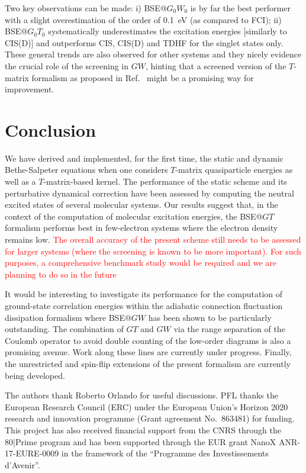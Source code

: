 \documentclass[aip,jcp,reprint,noshowkeys,superscriptaddress]{revtex4-1}
\newcommand{\alert}[1]{\textcolor{red}{#1}}
\begin{document}
Two key observations can be made:
i) BSE@$G_0W_0$ is by far the best performer with a slight overestimation of the order of \SI{0.1}{eV} (as compared to FCI);
ii) BSE@$G_0T_0$ systematically underestimates the excitation energies [similarly to CIS(D)] and outperforms CIS, CIS(D) and TDHF for the singlet states only. 
These general trends are also observed for other systems and they nicely evidence the crucial role of the screening in $GW$, hinting that a screened version of the $T$-matrix formalism as proposed in Ref.~ might be a promising way for improvement.

\section{Conclusion}
\label{sec:ccl}
We have derived and implemented, for the first time, the static and dynamic Bethe-Salpeter equations when one considers $T$-matrix quasiparticle energies as well as a $T$-matrix-based kernel.
The performance of the static scheme and its perturbative dynamical correction have been assessed by computing the neutral excited states of several molecular systems.
Our results suggest that, in the context of the computation of molecular excitation energies, the BSE@$GT$ formalism performs best in few-electron systems where the electron density remains low.
\alert{The overall accuracy of the present scheme still needs to be assessed for larger systems (where the screening is known to be more important). 
For such purposes, a comprehensive benchmark study would be required and we are planning to do so in the future}

It would be interesting to investigate its performance for the computation of ground-state correlation energies within the adiabatic connection fluctuation dissipation formalism where BSE@$GW$ has been shown to be particularly outstanding. \cite{Maggio_2016,Holzer_2018b,Loos_2020e}
The combination of $GT$ and $GW$ via the range separation of the Coulomb operator to avoid double counting of the low-order diagrams is also a promising avenue.
Work along these lines are currently under progress.
Finally, the unrestricted and spin-flip extensions of the present formalism are currently being developed.

\begin{acknowledgements}
The authors thank Roberto Orlando for useful discussions.
PFL thanks the European Research Council (ERC) under the European Union's Horizon 2020 research and innovation programme (Grant agreement No.~863481) for funding.
This project has also received financial support from the CNRS through the 80|Prime program and has been supported through the EUR grant NanoX ANR-17-EURE-0009 in the framework of the ``Programme des Investissements d’Avenir''.
\end{acknowledgements}
\end{document}
